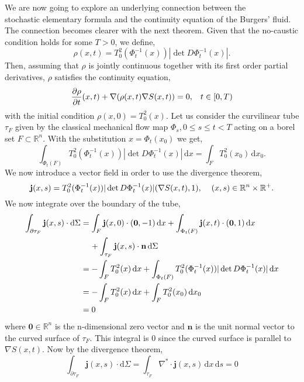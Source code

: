 \documentclass[a4paper,12pt,draft]{report}
\begin{document}
We are now going to explore an underlying connection between the \\stochastic elementary formula and the continuity equation of the Burgers' fluid.  The connection becomes clearer with the next theorem.
\theorem
{
Given that the no-caustic condition holds for some $T > 0$, we define,
$$
\rho(x, t) = T_0^2(\Phi_t^{-1}(x))|\det D\Phi_t^{-1}(x)|.
$$
Then, assuming that $\rho$ is jointly continuous together with its first order partial derivatives, $\rho$ satisfies the continuity equation,
$$
\frac{\partial \rho}{\partial t}(x, t) + \nabla(\rho(x, t)\nabla S(x, t)) = 0, \hspace{0.3cm} t \in [0, T)
$$
with the initial condition $\rho(x, 0) = T_0^2(x)$.
}
\proof
{
Let us consider the curvilinear tube $\tau_F$ given by the classical mechanical flow map $\Phi_s, 0 \le s\le t < T$ acting on a borel set $F \subset \mathbb{R}^n$.
With the substitution $x = \Phi_t(x_0)$ we get,
$$
\int_{\Phi_t(F)} T_0^2(\Phi_t^{-1}(x))|\det D\Phi_t^{-1}(x)|\,\mathrm{d}x = \int_F T_0^2(x_0)\,\mathrm{d}x_0.
$$
We now introduce a vector field in order to use the divergence theorem,
$$
\mathbf{j}(x, s) = T_0^2(\Phi_t^{-1}(x))|\det D\Phi_t^{-1}(x)|(\nabla S(x, t), 1), \hspace{0.4cm}(x, s) \in \mathbb{R}^n \times \mathbb{R}^+.
$$
We now integrate over the boundary of the tube,
\begin{align}
\int_{\partial \tau_F} \mathbf{j}(x, s)\cdot \mathrm{d}\Sigma & = \int_F \mathbf{j}(x, 0)\cdot(\mathbf{0}, -1)\,\mathrm{d}x + \int_{\Phi_t(F)} \mathbf{j}(x, t)\cdot(\mathbf{0}, 1)\,\mathrm{d}x \nonumber\\
& \hspace{0.4cm} + \int_{\tau_F} \mathbf{j}(x, s)\cdot \mathbf{n}\,\mathrm{d}\Sigma \nonumber\\
& = -\int_F T_0^2(x)\,\mathrm{d}x + \int_{\Phi_t(F)} T_0^2(\Phi_t^{-1}(x))|\det D\Phi_t^{-1}(x)|\,\mathrm{d}x\nonumber\\
& = -\int_F T_0^2(x)\,\mathrm{d}x + \int_F T_0^2(x_0)\,\mathrm{d}x_0\nonumber\\
& = 0\nonumber
\end{align}
where $\mathbf{0} \in \mathbb{R}^n$ is the n-dimensional zero vector and $\mathbf{n}$ is the unit normal vector to the curved surface of $\tau_F$.  This integral is $0$ since the curved surface is parallel to $\nabla S(x, t)$.  Now by the divergence theorem,
$$
\int_{\partial \tau_F} \mathbf{j}(x, s)\cdot \mathrm{d}\Sigma = \int_{\tau_F} \nabla^* \cdot \mathbf{j}(x, s)\,\mathrm{d}x\,\mathrm{d}s = 0
$$}
\end{document}
